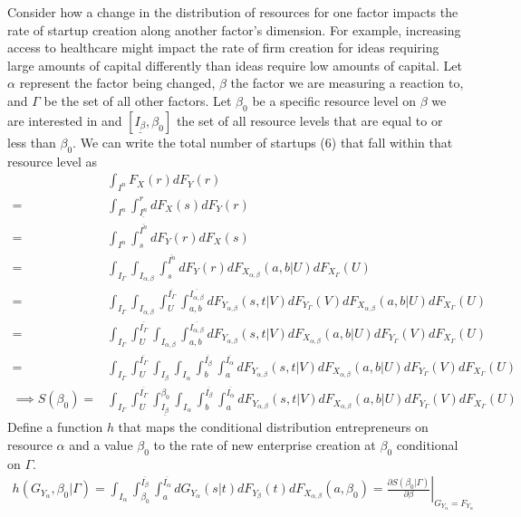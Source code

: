 \documentclass[12pt]{article}
\begin{document}
Consider how a change in the distribution of resources for one factor impacts the rate of startup creation along another factor's dimension. For example, increasing access to healthcare might impact the rate of firm creation for ideas requiring large amounts of capital differently than ideas require low amounts of capital. Let $\alpha$ represent the factor being changed, $\beta$ the factor we are measuring a reaction to, and $\Gamma$ be the set of all other factors. Let $\beta_0$ be a specific resource level on $\beta$ we are interested in and $[\underline{I_\beta}, \beta_0]$ the set of all resource levels that are equal to or less than $\beta_0$. We can write the total number of startups (6) that fall within that resource level as
\begin{align*}
& \int_{I^n} F_X(r) dF_Y(r)\\
= & \int_{I^n} \int_{\underline{I^n}}^{r} dF_X(s) dF_Y(r)\\
= & \int_{I^n} \int_{s}^{\overline{I^n}}  dF_Y(r) dF_X(s) \\
= &  \int_{I_{\Gamma}} \int_{I_{\alpha,\beta}} \int_{s}^{\overline{I^n}}  dF_Y(r)dF_{X_{\alpha,\beta}}(a,b|U)
 dF_{X_{\Gamma}}(U)\\
= &  \int_{I_{\Gamma}} \int_{I_{\alpha,\beta}} \int_{U}^{\overline{I_\Gamma}} \int_{a,b}^{\overline{I_{\alpha,\beta}}} dF_{Y_{\alpha,\beta}}(s,t|V)dF_{Y_\Gamma}(V) dF_{X_{\alpha,\beta}}(a,b|U) dF_{X_{\Gamma}}(U)\\
= &  \int_{I_{\Gamma}} \int_{U}^{\overline{I_\Gamma}} \int_{I_{\alpha,\beta}} \int_{a,b}^{\overline{I_{\alpha,\beta}}} dF_{Y_{\alpha,\beta}}(s,t|V) dF_{X_{\alpha,\beta}}(a,b|U) dF_{Y_\Gamma}(V) dF_{X_{\Gamma}}(U)\\
= &  \int_{I_{\Gamma}} \int_{U}^{\overline{I_\Gamma}} \int_{I_{\beta}} \int_{I_{\alpha}} \int_{b}^{\overline{I_{\beta}}} \int_{a}^{\overline{I_{\alpha}}} dF_{Y_{\alpha,\beta}}(s,t|V) dF_{X_{\alpha,\beta}}(a,b|U) dF_{Y_\Gamma}(V) dF_{X_{\Gamma}}(U)\\
\implies S(\beta_0) = & \int_{I_{\Gamma}} \int_{U}^{\overline{I_\Gamma}} \int_{\underline{I_\beta}}^{\beta_0} \int_{I_{\alpha}} \int_{b}^{\overline{I_{\beta}}} \int_{a}^{\overline{I_{\alpha}}} dF_{Y_{\alpha,\beta}}(s,t|V) dF_{X_{\alpha,\beta}}(a,b|U) dF_{Y_\Gamma}(V) dF_{X_{\Gamma}}(U)
\end{align*}
Define a function $h$ that maps the conditional distribution entrepreneurs on resource $\alpha$ and a value $\beta_0$ to the rate of new enterprise creation at $\beta_0$ conditional on $\Gamma$.
\begin{align*}
h(G_{Y_\alpha},\beta_0|\Gamma) = \int_{I_{\alpha}} \int_{\beta_0}^{\overline{I_{\beta}}} \int_{a}^{\overline{I_{\alpha}}} dG_{Y_{\alpha}}(s|t) dF_{Y_{\beta}}(t) dF_{X_{\alpha,\beta}}(a,\beta_0) = \left. \frac{\partial S (\beta_0|\Gamma)}{\partial \beta} \right|_{G_{Y_{\alpha}}=F_{Y_{\alpha}}}
\end{align*}
\end{document}
